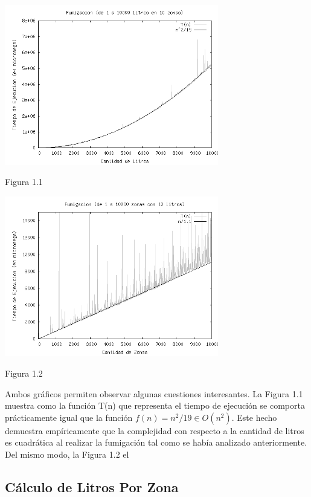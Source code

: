 \documentclass[a4paper,10pt] {article}
\begin{document}
\begin{center}
 \includegraphics[width=0.7\textwidth]{Plots/Tp2Ej1-TiemposFumigacionPorLitros-10zonas-bw.png}
\begin{center}
Figura 1.1
\end{center}
\includegraphics[width=0.7\textwidth]{Plots/Tp2Ej1-TiemposFumigacionPorZonas-10litros-bw.png}
\begin{center}
Figura 1.2
\end{center}
\end{center}

Ambos gráficos permiten observar algunas cuestiones interesantes. La Figura 1.1 muestra como la función T(n) que representa el tiempo de ejecución se comporta prácticamente igual que la función $f(n) = n^2/19 \in O(n^2)$. Este hecho demuestra empíricamente que la complejidad con respecto a la cantidad de litros es cuadrática al realizar la fumigación tal como se había analizado anteriormente. Del mismo modo, la Figura 1.2 el


\subsection*{Cálculo de Litros Por Zona}
\end{document}
